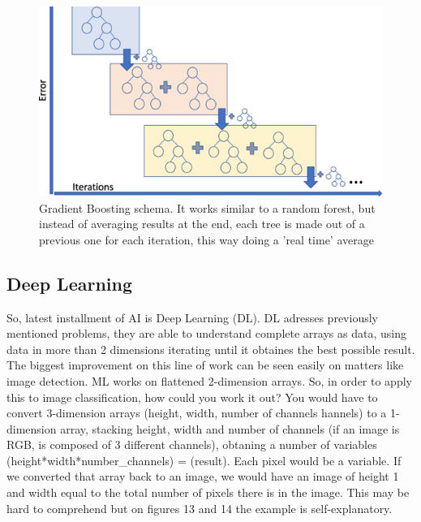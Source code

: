 \documentclass[openany]{article}
\begin{document}
\begin{figure}[!h]
    \centering
    \includegraphics[width=\textwidth]{Gradient Boosting.png}
    \caption{Gradient Boosting schema. It works similar to a random forest, but instead of averaging results at the end, each tree is made out of a previous one for each iteration, this way doing a 'real time' average}
    \label{fig:my_label}
\end{figure}


\newpage 


\subsection{Deep Learning}

So, latest installment of AI is Deep Learning (DL). DL adresses previously mentioned problems, they are able to understand complete arrays as data, using data in more than 2 dimensions iterating until it obtaines the best possible result. The biggest improvement on this line of work can be seen easily on matters like image detection. ML works on flattened 2-dimension arrays. So, in order to apply this to image classification, how could you work it out? You would have to convert 3-dimension arrays (height, width, number of channels hannels) to a 1-dimension array, stacking height, width and number of channels (if an image is RGB, is composed of 3 different channels), obtaning a number of variables (height*width*number\_channels) = (result). Each pixel would be a variable. If we converted that array back to an image, we would have an image of height 1 and width equal to the total number of pixels there is in the image. This may be hard to comprehend but on figures 13 and 14 \cite{Dog} the example is self-explanatory.
\end{document}
